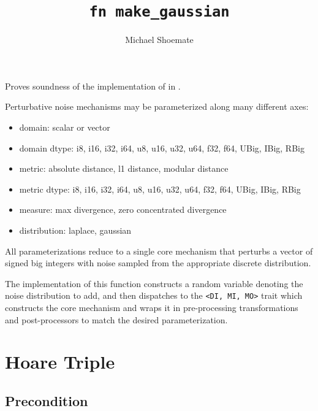 \documentclass{article}
\title{\texttt{fn make\_gaussian}}
\author{Michael Shoemate}
\date{}
\begin{document}
\maketitle

\contrib
Proves soundness of the implementation of  in .

Perturbative noise mechanisms may be parameterized along many different axes:
\begin{itemize}
    \item domain: scalar or vector
    \item domain dtype: i8, i16, i32, i64, u8, u16, u32, u64, f32, f64, UBig, IBig, RBig
    \item metric: absolute distance, l1 distance, modular distance
    \item metric dtype: i8, i16, i32, i64, u8, u16, u32, u64, f32, f64, UBig, IBig, RBig
    \item measure: max divergence, zero concentrated divergence
    \item distribution: laplace, gaussian
\end{itemize}

All parameterizations reduce to a single core mechanism that perturbs
a vector of signed big integers with noise sampled from the appropriate discrete distribution.

The implementation of this function constructs a random variable denoting the noise distribution to add, 
and then dispatches to the \texttt{<DI, MI, MO>} trait
which constructs the core mechanism and wraps it in pre-processing transformations and post-processors to match the desired parameterization.

\section{Hoare Triple}
\subsection*{Precondition}
\end{document}
